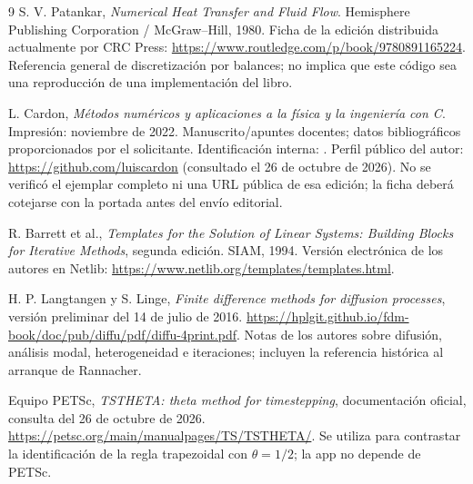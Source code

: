 \documentclass[11pt,a4paper]{article}
\newcommand{\code}[1]{\texttt{\detokenize{#1}}}
\begin{document}
\FloatBarrier
\begin{thebibliography}{9}
S. V. Patankar, \emph{Numerical Heat Transfer and Fluid Flow}.
Hemisphere Publishing Corporation / McGraw--Hill, 1980.
Ficha de la edición distribuida actualmente por CRC Press:
\url{https://www.routledge.com/p/book/9780891165224}.
Referencia general de discretización por balances; no implica que este código
sea una reproducción de una implementación del libro.

L. Cardon, \emph{Métodos numéricos y aplicaciones a la física y la ingeniería
con C}. Impresión: noviembre de 2022. Manuscrito/apuntes docentes; datos
bibliográficos proporcionados por el solicitante. Identificación interna:
\code{dell:REPO/cursoMN.tex}. Perfil público del autor:
\url{https://github.com/luiscardon} (consultado el 26 de octubre de 2026).
No se verificó el ejemplar completo ni una URL pública de esa edición;
la ficha deberá cotejarse con la portada antes del envío editorial.

R. Barrett et al., \emph{Templates for the Solution of Linear Systems:
Building Blocks for Iterative Methods}, segunda edición. SIAM, 1994.
Versión electrónica de los autores en Netlib:
\url{https://www.netlib.org/templates/templates.html}.

H. P. Langtangen y S. Linge, \emph{Finite difference methods for diffusion
processes}, versión preliminar del 14 de julio de 2016.
\url{https://hplgit.github.io/fdm-book/doc/pub/diffu/pdf/diffu-4print.pdf}.
Notas de los autores sobre difusión, análisis modal, heterogeneidad e
iteraciones; incluyen la referencia histórica al arranque de Rannacher.

Equipo PETSc, \emph{TSTHETA: theta method for timestepping}, documentación
oficial, consulta del 26 de octubre de 2026.
\url{https://petsc.org/main/manualpages/TS/TSTHETA/}.
Se utiliza para contrastar la identificación de la regla trapezoidal con
$\theta=1/2$; la app no depende de PETSc.
\end{thebibliography}
\end{document}
